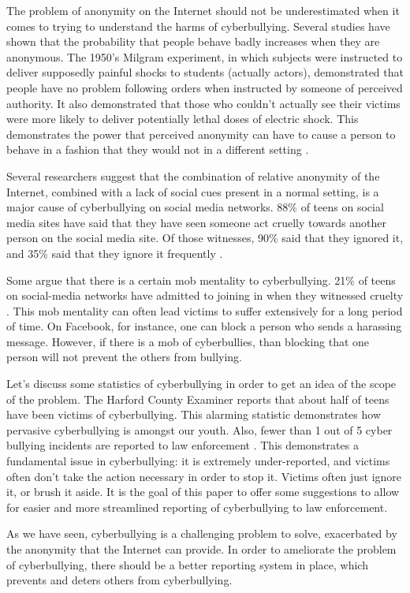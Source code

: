     The problem of anonymity on the Internet should not be underestimated when it comes to trying to understand the harms of cyberbullying. Several studies have shown that the probability that people behave badly increases when they are anonymous. The 1950's Milgram experiment, in which subjects were instructed to deliver supposedly painful shocks to students (actually actors), demonstrated that people have no problem following orders when instructed by someone of perceived authority. It also demonstrated that those who couldn't actually see their victims were more likely to deliver potentially lethal doses of electric shock. This demonstrates the power that perceived anonymity can have to cause a person to behave in a fashion that they would not in a different setting \cite{eldridge}. 
    
    	Several researchers suggest that the combination of relative anonymity of the Internet, combined with a lack of social cues present in a normal setting, is a major cause of cyberbullying on social media networks. 88\% of teens on social media sites have said that they have seen someone act cruelly towards another person on the social media site. Of those witnesses, 90\% said that they ignored it, and 35\% said that they ignore it frequently \cite{eldridge}. 
    	
	Some argue that there is a certain mob mentality to cyberbullying. 21\% of teens on social-media networks have admitted to joining in when they witnessed cruelty \cite{eldridge}. This mob mentality can often lead victims to suffer extensively for a long period of time. On Facebook, for instance, one can block a person who sends a harassing message. However, if there is a mob of cyberbullies, than blocking that one person will not prevent the others from bullying.

	Let's discuss some statistics of cyberbullying in order to get an idea of the scope of the problem. The Harford County Examiner reports that about half of teens have been victims of cyberbullying. This alarming statistic demonstrates how pervasive cyberbullying is amongst our youth. Also, fewer than 1 out of 5 cyber bullying incidents are reported to law enforcement \cite{stats}.  This demonstrates a fundamental issue in cyberbullying: it is extremely under-reported, and victims often don't take the action necessary in order to stop it. Victims often just ignore it, or brush it aside. It is the goal of this paper to offer some suggestions to allow for easier and more streamlined reporting of cyberbullying to law enforcement.
	
	As we have seen, cyberbullying is a challenging problem to solve, exacerbated by the anonymity that the Internet can provide. In order to ameliorate the problem of cyberbullying, there should be a better reporting system in place, which prevents and deters others from cyberbullying.